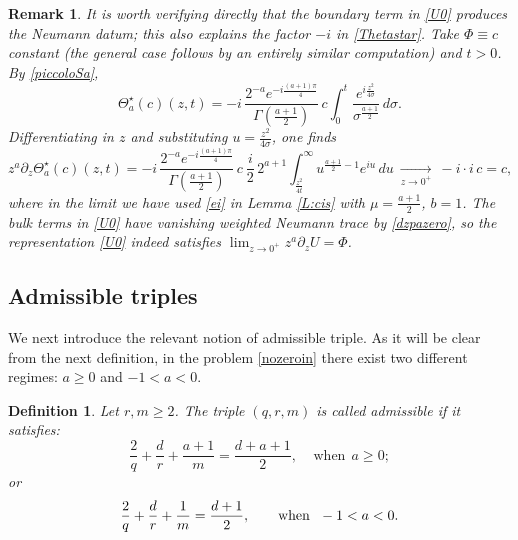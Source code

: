 \documentclass[11pt,letter]{amsart}
\newcommand{\p}{\partial}
\numberwithin{equation}{section}
\newtheorem{remark}[theorem]{Remark}
\newtheorem{definition}[theorem]{Definition}
\numberwithin{equation}{section}
\begin{document}
\begin{remark}\label{R:signcheck}
It is worth verifying directly that the boundary term in \eqref{U0} produces the Neumann datum; this also explains the factor $-i$ in \eqref{Thetastar}. Take $\Phi\equiv c$ constant (the general case follows by an entirely similar computation) and $t>0$. By \eqref{piccoloSa},
\[
\Theta_a^\star(c)(z,t) = -i\, \frac{2^{-a}e^{-i\frac{(a+1)\pi}4}}{\Gamma(\frac{a+1}2)}\, c \int_0^t \frac{e^{i\frac{z^2}{4\sigma}}}{\sigma^{\frac{a+1}2}}\, d\sigma .
\]
Differentiating in $z$ and substituting $u = \frac{z^2}{4\sigma}$, one finds
\[
z^a\p_z \Theta_a^\star(c)(z,t) = -i\,\frac{2^{-a}e^{-i\frac{(a+1)\pi}4}}{\Gamma(\frac{a+1}2)}\, c\ \frac{i}{2}\, 2^{a+1} \int_{\frac{z^2}{4t}}^\infty u^{\frac{a+1}2-1} e^{iu}\, du\ \underset{z\to 0^+}{\longrightarrow}\ -i\cdot i\, c = c,
\]
where in the limit we have used \eqref{ei} in Lemma \ref{L:cis} with $\mu = \frac{a+1}2$, $b=1$. The bulk terms in \eqref{U0} have vanishing weighted Neumann trace by \eqref{dzpazero}, so the representation \eqref{U0} indeed satisfies $\lim_{z\to0^+}z^a\p_zU = \Phi$.
\end{remark}


\subsection{Admissible triples} We next introduce the relevant notion of admissible triple. As it will be clear from the next definition, in the problem \eqref{nozeroin} there exist two different regimes: $a\ge 0$ and $-1<a<0$. 

\begin{definition}\label{D:ac3}
Let $r, m\ge 2$. The triple $(q,r,m)$ is called \emph{admissible} if it satisfies:  
\begin{equation}\label{ac3}
\frac 2q + \frac dr + \frac{a+1}m = \frac{d +a+1}2,\ \ \ \ \ \text{when}\ \  a\ge 0;
\end{equation}
or
\begin{equation}\label{ac0}
\frac 2q + \frac dr +\frac 1m = \frac{d+1}2, \ \ \ \\ \ \ \ \ \text{when}\ \  -1<a< 0.
\end{equation}
\end{definition}
\end{document}
